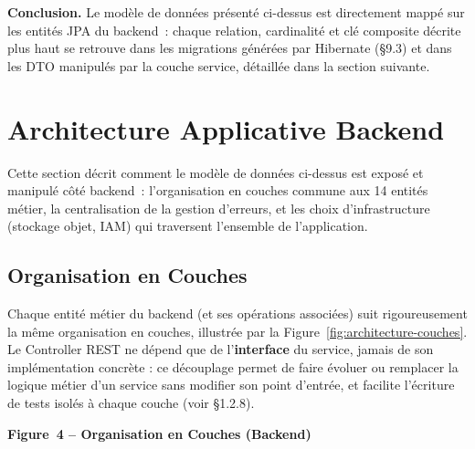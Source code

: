 \documentclass[a4paper,12pt]{article}
\begin{document}
\newpage

\textbf{Conclusion.} Le modèle de données présenté ci-dessus est directement mappé sur les entités JPA du backend~: chaque relation, cardinalité et clé composite décrite plus haut se retrouve dans les migrations générées par Hibernate (\S9.3) et dans les DTO manipulés par la couche service, détaillée dans la section suivante.

\section{Architecture Applicative Backend}

Cette section décrit comment le modèle de données ci-dessus est exposé et manipulé côté backend~: l'organisation en couches commune aux 14 entités métier, la centralisation de la gestion d'erreurs, et les choix d'infrastructure (stockage objet, IAM) qui traversent l'ensemble de l'application.

\subsection{Organisation en Couches}
Chaque entité métier du backend (et ses opérations associées) suit rigoureusement la même organisation en couches, illustrée par la Figure~\ref{fig:architecture-couches}. Le Controller REST ne dépend que de l'\textbf{interface} du service, jamais de son implémentation concrète : ce découplage permet de faire évoluer ou remplacer la logique métier d'un service sans modifier son point d'entrée, et facilite l'écriture de tests isolés à chaque couche (voir \S1.2.8).

\begin{center}
\textbf{Figure~4 -- Organisation en Couches (Backend)}\label{fig:architecture-couches}
\vspace{0.3cm}

\end{center}
\end{document}
